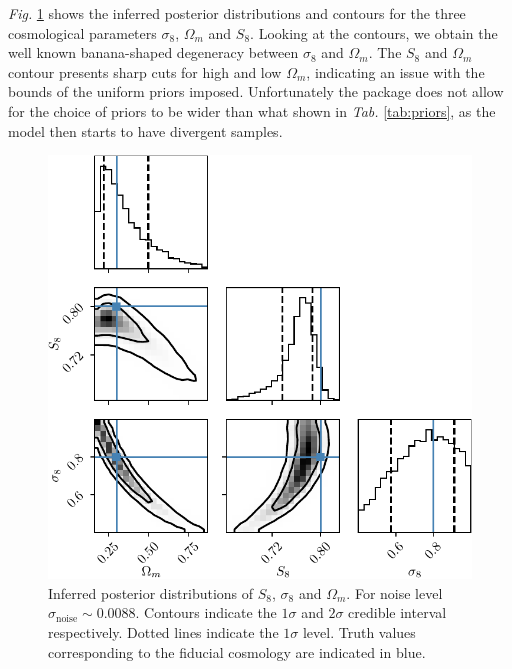 \textit{Fig. }\ref{fig:MCMC two parameters} shows the inferred posterior distributions and contours for the three cosmological parameters $\sigma_8$, $\Omega_m$ and $S_8$. Looking at the contours, we obtain the well known banana-shaped degeneracy between $\sigma_8$ and $\Omega_m$. The $S_8$ and $\Omega_m$ contour presents sharp cuts for  high and low $\Omega_m$, indicating an issue with the bounds of the uniform priors imposed. Unfortunately the  package does not allow for the choice of priors to be wider than what shown in \textit{Tab. }\ref{tab:priors}, as the model then starts to have divergent samples.
\begin{figure}[h]
    \centering
    \includegraphics[width=\textwidth]{images/5_MCMC_two_parameters.pdf}
    \caption{\label{fig:MCMC two parameters} Inferred posterior distributions of $S_8$, $\sigma_8$ and $\Omega_m$. For noise level $\sigma_\text{noise}\sim 0.0088$. Contours indicate the $1\sigma$ and $2\sigma$ credible interval respectively. Dotted lines indicate the $1\sigma$ level. Truth values corresponding to the fiducial cosmology are indicated in blue.}
\end{figure}

